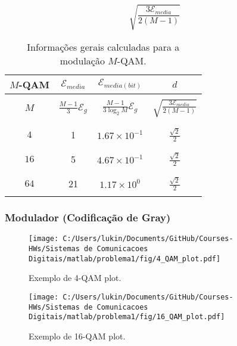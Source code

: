 $$\sqrt{\frac{3 \mathcal{E}_{media}}{2(M-1)}} $$

\begin{table}[!ht]
    \centering
    \begin{tabular}{|c|c|c|c|}
    \hline
    $M$-QAM & $\mathcal{E}_{media}$ & $\mathcal{E}_{media(bit)}$ & $d$ \\ \hline
    & &  &  \\ 
    $M$ & $\frac{M-1}{3} \mathcal{E}_g$ & $ \frac{M-1}{3\log_2 M} \mathcal{E}_g$ & $\sqrt{\frac{3 \mathcal{E}_{media}}{2(M-1)}} $ \\ 
    & &  &  \\ \hline
    & &  &  \\ 
    $4$     & 1 & $1.67\times 10^{-1}$ & $\frac{\sqrt{2}}{2}$ \\ 
    & &  &  \\ \hline
    & &  &  \\ 
    $16$    & 5 & $4.67\times 10^{-1}$ & $\frac{\sqrt{2}}{2}$ \\ 
    & &  &  \\ \hline
    & &  &  \\ 
    $64$    & 21 & $1.17\times 10^{0}$ & $\frac{\sqrt{2}}{2}$ \\
    & &  &  \\ \hline
    \end{tabular}
    \caption{Informações gerais calculadas para a modulação $M$-QAM.}
    \label{tab:Resume_QAM}
\end{table}

\subsubsection{Modulador (Codificação de Gray)}

\begin{figure}[!ht]
    \centering
    \texttt{[image: C:/Users/lukin/Documents/GitHub/Courses-HWs/Sistemas de Comunicacoes Digitais/matlab/problema1/fig/4\_QAM\_plot.pdf]}
    \caption{Exemplo de 4-QAM plot.}
    \label{fig:4_QAM_plot}
\end{figure}

\begin{figure}[!ht]
    \centering
    \texttt{[image: C:/Users/lukin/Documents/GitHub/Courses-HWs/Sistemas de Comunicacoes Digitais/matlab/problema1/fig/16\_QAM\_plot.pdf]}
    \caption{Exemplo de 16-QAM plot.}
    \label{fig:16_QAM_plot}
\end{figure}

